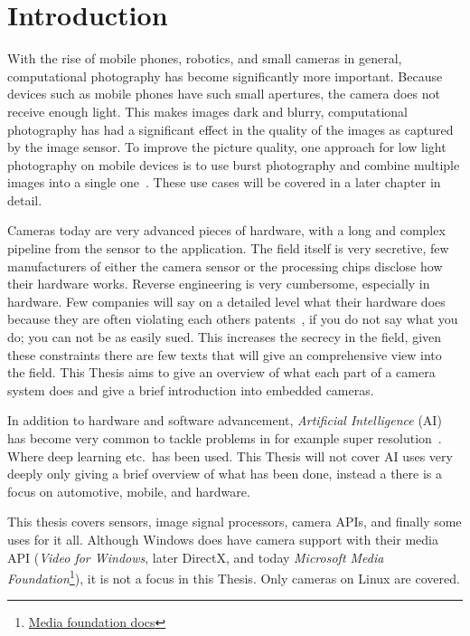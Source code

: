 \chapter{Introduction\label{intro}}
With the rise of mobile phones, robotics, and small cameras in general,
computational photography has become significantly more important. Because
devices such as mobile phones have such small apertures, the camera does not
receive enough light. This makes images dark and blurry, computational
photography has had a significant effect in the quality of the images as
captured by the image sensor. To improve the picture quality, one approach for
low light photography on mobile devices is to use burst photography and combine
multiple images into a single one~\cite{burstPhotMobile}. These use cases will
be covered in a later chapter in detail.

Cameras today are very advanced pieces of hardware, with a long and complex
pipeline from the sensor to the application. The field itself is very
secretive, few manufacturers of either the camera sensor or the processing
chips disclose how their hardware works. Reverse engineering is very
cumbersome, especially in hardware. Few companies will say on a detailed level
what their hardware does because they are often violating each others patents~\cite{experimentalCompPhot},
if you do not say what you do; you can not be as easily
sued. This increases the secrecy in the field, given these constraints there
are few texts that will give an comprehensive view into the field. This Thesis
aims to give an overview of what each part of a camera system does and give a
brief introduction into embedded cameras.

In addition to hardware and software advancement, \textit{Artificial Intelligence} (AI)
has become very common to tackle problems in for example super resolution~\cite{yangDeepLearningSingle2019, delbracio2021mobile}.
Where deep learning etc.\ has been used. This Thesis will not cover AI uses very deeply
only giving a brief overview of what has been done, instead a there is a focus
on automotive, mobile, and hardware.

This thesis covers sensors, image signal processors, camera APIs, and finally
some uses for it all. Although Windows does have camera support with their
media API (\textit{Video for Windows}, later DirectX, and today
\textit{Microsoft Media Foundation}\footnote{\href{https://learn.microsoft.com/en-us/windows/win32/medfound/microsoft-media-foundation-sdk}{Media
foundation docs}}), it is not a focus in this Thesis. Only cameras on Linux are
covered.
